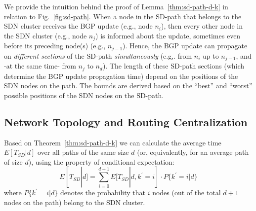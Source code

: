 We provide the intuition behind the proof of Lemma~\ref{thm:sd-path-d-k} in relation to Fig.~\ref{fig:sd-path}. When a node in the SD-path that belongs to the SDN cluster receives the BGP update (e.g., node $n_{i}$), then every other node in the SDN cluster (e.g., node $n_{j}$) is informed about the update, sometimes even before its preceding node(s) (e.g., $n_{j-1}$). Hence, the BGP update can propagate on \textit{different sections} of the SD-path \textit{simultaneously} (e.g,. from $n_{i}$ up to $n_{j-1}$, and -at the same time- from $n_{j}$ to $n_{d}$). The length of these SD-path sections (which determine the BGP update propagation time) depend on the positions of the SDN nodes on the path. The bounds are derived based on the ``best'' and ``worst'' possible positions of the SDN nodes on the SD-path.





\subsection{Network Topology and Routing Centralization}\label{sec:topo-and-sdn}
Based on Theorem~\ref{thm:sd-path-d-k} we can calculate the average time $E[T_{SD}|d]$ over all paths of the same size $d$ (or, equivalently, for an average path of size $d$), using the property of conditional expectation:%
\begin{equation}\label{eq:Tsd-conditional-k}
E[T_{SD}|d] = \sum_{i=0}^{d+1} E[T_{SD}|d,k^{'}=i] \cdot P\{k^{'}=i|d\}
\end{equation}
where $P\{k^{'}=i|d\}$ denotes the probability that $i$ nodes (out of the total $d+1$ nodes on the path) belong to the SDN cluster.

